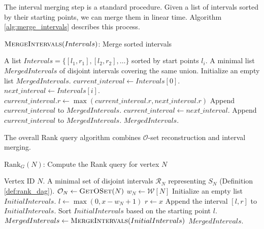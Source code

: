 The interval merging step is a standard procedure. Given a list of intervals sorted by their starting points, we can merge them in linear time. Algorithm \ref{alg:merge_intervals} describes this process.
\begin{algorithm}[htbp]
    \caption{$\textsc{MergeIntervals}(Intervals)$: Merge sorted intervals}
    \label{alg:merge_intervals}
    \small
    \begin{algorithmic}[1]
        \Require A list $Intervals = \{[l_1, r_1], [l_2, r_2], \dots\}$ sorted by start points $l_i$.
        \Ensure A minimal list $MergedIntervals$ of disjoint intervals covering the same union.
        \State Initialize an empty list $MergedIntervals$.
        \State $current\_interval \gets Intervals[0]$.
        \State $next\_interval \gets Intervals[i]$.
        \State $current\_interval.r \gets \max(current\_interval.r, next\_interval.r)$
        \Else
        \State Append $current\_interval$ to $MergedIntervals$.
        \State $current\_interval \gets next\_interval$.
        \EndIf
        \EndFor
        \State Append $current\_interval$ to $MergedIntervals$.
        \EndIf
        \State \Return $MergedIntervals$.
    \end{algorithmic}
\end{algorithm}

The overall Rank query algorithm combines $\mathcal{O}$-set reconstruction and interval merging.

\begin{algorithm}
    \caption{$\mathrm{Rank}_G(N)$: Compute the Rank query for vertex $N$}
    \label{alg:rank_dag}
    \small
    \begin{algorithmic}[1]
        \Require Vertex ID $N$.
        \Ensure A minimal set of disjoint intervals $\mathcal{R}_N$ representing $S_N$ (Definition \ref{def:rank_dag}).
        \State $\mathcal{O}_N \gets \textsc{GetOSet}(N)$
        \State $w_N \gets \mathcal{W}[N]$
        \State Initialize an empty list $InitialIntervals$.
        \State $l \gets \max(0, x - w_N + 1)$
        \State $r \gets x$
        \State Append the interval $[l, r]$ to $InitialIntervals$.
        \EndFor
        \State Sort $InitialIntervals$ based on the starting point $l$.
        \State $MergedIntervals \gets \textsc{MergeIntervals}(InitialIntervals)$
        \State \Return $MergedIntervals$.
    \end{algorithmic}
\end{algorithm}

